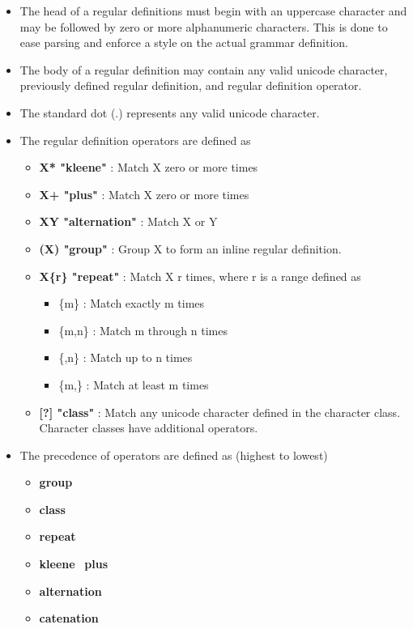 \documentclass[12pt]{article}
\begin{document}
\begin{itemize}

\item The head of a regular definitions must begin with an uppercase character and may be followed by zero or more alphanumeric characters. This is done to ease parsing and enforce a style on the actual grammar definition.

\item The body of a regular definition may contain any valid unicode character, previously defined regular definition, and regular definition operator.

\item The standard dot (.) represents any valid unicode character.

\item The regular definition operators are defined as
  \begin{itemize}
    \item \textbf{X* "kleene"} : Match X zero or more times
    \item \textbf{X+ "plus"} : Match X zero or more times
    \item \textbf{X\textbar Y "alternation"} : Match X or Y
    \item \textbf{(X) "group"}  : Group X to form an inline regular definition.
    \item \textbf{X\{r\} "repeat"}  : Match X r times, where r is a range defined as 
      \begin{itemize}
        \item \{m\} : Match exactly m times
        \item \{m,n\} : Match m through n times
        \item \{,n\} : Match up to n times
        \item \{m,\} : Match at least m times
      \end{itemize}
    \item \textbf{[?] "class"} : Match any unicode character defined in the character class. Character classes have additional operators.
  \end{itemize}

\item The precedence of operators are defined as (highest to lowest)
  \begin{itemize}
    \item \textbf{group}
    \item \textbf{class}
    \item \textbf{repeat}
    \item \textbf{kleene} \textbar \ \textbf{plus}
    \item \textbf{alternation}
    \item \textbf{catenation}
  \end{itemize} 


\end{itemize}
\end{document}
